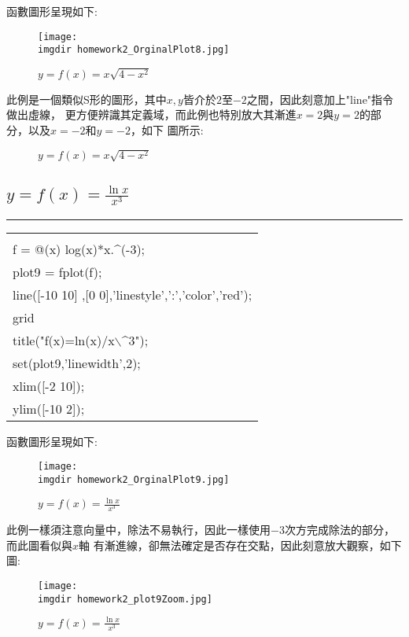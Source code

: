 		函數圖形呈現如下:
		\begin{figure}[H]	
		 	 \centering	 			 	 
   			 \texttt{[image: \\imgdir homework2\_OrginalPlot8.jpg]} 
   			 \caption{$y=f(x)=x\sqrt{4-x^2}$}   		
   			 \label{plot8}   			 		 
		\end{figure}
		
		此例是一個類似S形的圖形，其中$x,y$皆介於$2$至$-2$之間，因此刻意加上"line"指令做出虛線，			更方便辨識其定義域，而此例也特別放大其漸進$x=2$與$y=2$的部分，以及$x=-2$和$y=-2$，如下			圖所示:
		
		\begin{figure}[H]
    		 \centering
   			 \caption{$y=f(x)=x\sqrt{4-x^2}$}
   			 \label{plot8_leftright}
		\end{figure}		
		\subsection{$y=f(x)=\frac{\ln x}{x^3}$}%
		\rule{\textwidth}{0.2pt}
		\begin{center}\colorbox{slight}{
				\begin{tabular}{p{}}
					\MJHmarker{\textbf{MATLAB語法 :}}\\					
					f = @(x) log(x)*x.$\^$(-3);\\
					plot9 = fplot(f);\\
					line([-10 10] ,[0 0],'linestyle',':','color','red');\\
					grid\\
					title("f(x)=ln(x)/x$\backslash\^$3");\\
					set(plot9,'linewidth',2);\\
					xlim([-2 10]);\\
					ylim([-10 2]);\\
				\end{tabular}
			}
			\end{center}
			\newpage			
		函數圖形呈現如下:
		\begin{figure}[H]	
		 	 \centering	 			 	 
   			 \texttt{[image: \\imgdir homework2\_OrginalPlot9.jpg]} 
   			 \caption{$y=f(x)=\frac{\ln x}{x^3}$}   		
   			 \label{plot9}   			 		 
		\end{figure}
		
		此例一樣須注意向量中，除法不易執行，因此一樣使用$-3$次方完成除法的部分，而此圖看似與$x$軸			有漸進線，卻無法確定是否存在交點，因此刻意放大觀察，如下圖:
		\begin{figure}[H]	
		 	 \centering	 			 	 
   			 \texttt{[image: \\imgdir homework2\_plot9Zoom.jpg]} 
   			 \caption{$y=f(x)=\frac{\ln x}{x^3}$}   		
   			 \label{plot9zoom}   			 		 
		\end{figure}
		
